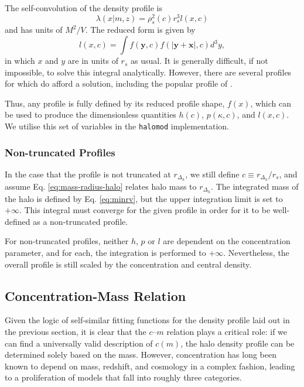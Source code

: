 \documentclass[5p,aas_macros]{elsarticle}
\begin{document}
The self-convolution of the density profile is
\begin{equation}
\label{eq:simplifiedlam}
 \lambda(x|m,z) = \rho_s^2(c) r_s^3 l(x,c)
\end{equation}
and has units of $M^2/V$. The reduced form is given by
\begin{equation}
\label{eq:lofxc}
l(x,c) = \int f(\mathbf{y},c)f(|\mathbf{y}+\mathbf{x}|,c)d^3y,
\end{equation}
in which $x$ and $y$ are in units of $r_s$ as usual. It is generally difficult, if not impossible, to solve this integral analytically. 
However, there are several profiles for which do afford a solution, including the popular profile of \citet[][hereafter NFW]{Navarro1997}.

Thus, any profile is fully defined by its reduced profile shape, $f(x)$, which can be used to produce the dimensionless quantities $h(c)$, $p(\kappa,c)$, and $l(x,c)$. We utilise this set of variables in the \verb|halomod| implementation. 

\subsubsection{Non-truncated Profiles}
In the case that the profile is not truncated at $r_{\Delta_h}$, we still define $c \equiv r_{\Delta_h}/r_s$, and assume Eq. \ref{eq:mass-radius-halo} relates halo mass to $r_{\Delta_h}$. 
The integrated mass of the halo is defined by Eq. \ref{eq:minrv}, but the upper integration limit is set to $+\infty$. This integral must converge for the given profile in order for it to be well-defined as a non-truncated profile.

For non-truncated profiles, neither $h$, $p$ or $l$ are dependent on the concentration parameter, and for each, the integration is performed to $+\infty$. Nevertheless, the overall profile is still scaled by the concentration and central density. 

\subsection{Concentration-Mass Relation}
\label{sec:theory:concentration}
Given the logic of self-similar fitting functions for the density profile laid out in the previous section, it is clear that the $c$--$m$ relation plays a critical role: if we can find a universally valid description of $c(m)$, the halo density profile can be determined solely based on the mass. However, concentration has long been known to depend on mass, redshift, and cosmology in a complex fashion, leading to a proliferation of models that fall into roughly three categories.
\end{document}

